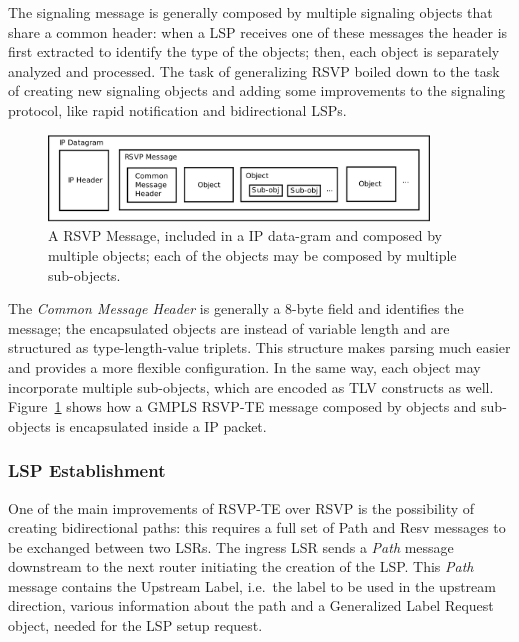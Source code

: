 \documentclass[10pt,a4paper]{report}
\begin{document}
The signaling message is generally composed by multiple signaling
objects that share a common header: when a LSP receives one of these
messages the header is first extracted to identify the type of the
objects; then, each object is separately analyzed and processed. The
task of generalizing RSVP boiled down to the task of creating new
signaling objects and adding some improvements to the signaling
protocol, like rapid notification and bidirectional LSPs.

\begin{figure}[!htbp]
  \centering
  \includegraphics[width=0.9\textwidth]{img/rsvp_message}
  \caption[RSVP message]{A RSVP Message, included in a IP data-gram
    and composed by multiple objects; each of the objects may be
    composed by multiple sub-objects.}
  \label{fig:rsvp_message}
\end{figure}

The \textit{Common Message Header} is generally a 8-byte field and
identifies the message; the encapsulated objects are instead of
variable length and are structured as type-length-value triplets. This
structure makes parsing much easier and provides a more flexible
configuration. In the same way, each object may incorporate multiple
sub-objects, which are encoded as TLV constructs as
well. Figure~\ref{fig:rsvp_message} shows how a GMPLS RSVP-TE message
composed by objects and sub-objects is encapsulated inside a IP
packet.

\subsubsection{LSP Establishment}
One of the main improvements of RSVP-TE over RSVP is the possibility
of creating bidirectional paths: this requires a full set of Path and
Resv messages to be exchanged between two LSRs. The ingress LSR sends
a \textit{Path} message downstream to the next router initiating the
creation of the LSP\@. This \textit{Path} message contains the
Upstream Label, i.e.\ the label to be used in the upstream direction,
various information about the path and a Generalized Label Request
object, needed for the LSP setup request.
\end{document}

